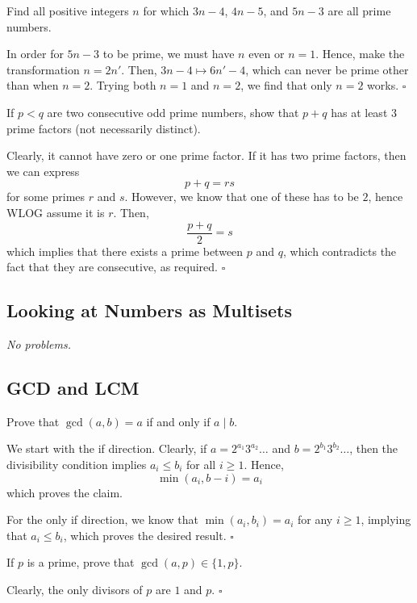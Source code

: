 \documentclass{article}
\begin{document}
\begin{problem}[1.4.1]{}
Find all positive integers $n$ for which $3n-4$, $4n-5$, and $5n-3$ are all prime numbers.
\end{problem}
In order for $5n-3$ to be prime, we must have $n$ even or $n = 1$. Hence, make the transformation $n = 2n'$. Then, $3n-4 \mapsto 6n'-4$, which can never be prime other than when $n = 2$. Trying both $n=1$ and $n=2$, we find that only $n = \boxed{2}$ works. $\square$

\begin{problem}[1.4.2]{}
If $p < q$ are two consecutive odd prime numbers, show that $p + q$ has at least $3$ prime factors (not necessarily distinct).
\end{problem}
Clearly, it cannot have zero or one prime factor. If it has two prime factors, then we can express \[p+q = rs\] for some primes $r$ and $s$. However, we know that one of these has to be $2$, hence WLOG assume it is $r$. Then, \[\dfrac{p+q}{2} = s\] which implies that there exists a prime between $p$ and $q$, which contradicts the fact that they are consecutive, as required. $\square$

\subsection{Looking at Numbers as Multisets}

\emph{No problems.}

\subsection{GCD and LCM}

\begin{problem}[1.6.1]{}
Prove that $\gcd(a, b) = a$ if and only if $a \mid b$.
\end{problem}
We start with the if direction. Clearly, if $a = 2^{a_1}3^{a_2}\dots$ and $b = 2^{b_1}3^{b_2}\dots$, then the divisibility condition implies $a_i \le b_i$ for all $i \ge 1$. Hence, \[\min(a_i, b-i) = a_i\] which proves the claim.

For the only if direction, we know that $\min(a_i, b_i) = a_i$ for any $i \ge 1$, implying that $a_i \le b_i$, which proves the desired result. $\square$

\begin{problem}[1.6.2]{}
If $p$ is a prime, prove that $\gcd(a, p) \in \{1, p\}$.
\end{problem}
Clearly, the only divisors of $p$ are $1$ and $p$. $\square$
\end{document}
